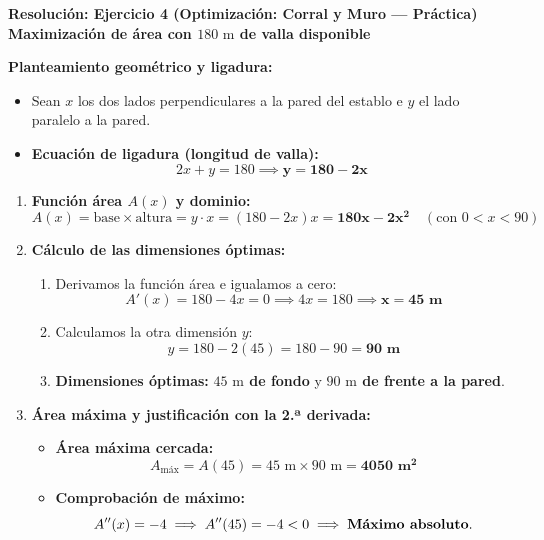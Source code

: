 \documentclass[11pt,a4paper]{article}
\begin{document}
\newpage

\begin{center}
    {\LARGE \textbf{Resolución: Ejercicio 4 (Optimización: Corral y Muro — Práctica)}}\\[4pt]
    {\large \textbf{Maximización de área con $180\text{ m}$ de valla disponible}}
\end{center}

\vspace{0.4cm}
\noindent\textbf{Planteamiento geométrico y ligadura:}
\begin{itemize}[leftmargin=1.5em, itemsep=3pt]
    \item Sean $x$ los dos lados perpendiculares a la pared del establo e $y$ el lado paralelo a la pared.
    \item \textbf{Ecuación de ligadura (longitud de valla):}
    \[
    2x + y = 180 \implies \mathbf{y = 180 - 2x}
    \]
\end{itemize}

\vspace{0.2cm}
\begin{enumerate}[label=\textbf{\alph*)}, leftmargin=2em, itemsep=8pt]
    \item \textbf{Función área $A(x)$ y dominio:}
    \[
    A(x) = \text{base} \times \text{altura} = y \cdot x = (180 - 2x)x = \mathbf{180x - 2x^2} \quad (\text{con } 0 < x < 90)
    \]

    \item \textbf{Cálculo de las dimensiones óptimas:}
    \begin{enumerate}[label=\arabic*., leftmargin=1.5em, itemsep=2pt]
        \item Derivamos la función área e igualamos a cero:
        \[
        A'(x) = 180 - 4x = 0 \implies 4x = 180 \implies \mathbf{x = 45\text{ m}}
        \]
        \item Calculamos la otra dimensión $y$:
        \[
        y = 180 - 2(45) = 180 - 90 = \mathbf{90\text{ m}}
        \]
        \item \textbf{Dimensiones óptimas:} \textbf{$45\text{ m}$ de fondo} y \textbf{$90\text{ m}$ de frente a la pared}.
    \end{enumerate}

    \item \textbf{Área máxima y justificación con la 2.ª derivada:}
    \begin{itemize}[leftmargin=1.5em, itemsep=2pt]
        \item \textbf{Área máxima cercada:}
        \[
        A_{\text{máx}} = A(45) = 45\text{ m} \times 90\text{ m} = \mathbf{4050\text{ m}^2}
        \]
        \item \textbf{Comprobación de máximo:}
        \[
        A''(x) = -4 \implies A''(45) = -4 < 0 \implies \text{\textbf{Máximo absoluto}}.
        \]
    \end{itemize}
\end{enumerate}
\end{document}
